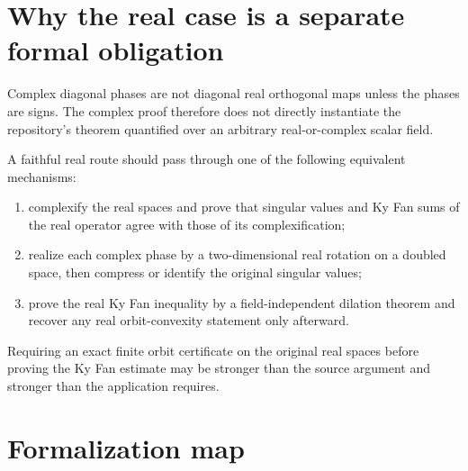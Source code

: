 \section{Why the real case is a separate formal obligation}

Complex diagonal phases are not diagonal real orthogonal maps unless the phases are signs. The complex proof therefore does not directly instantiate the repository's theorem quantified over an arbitrary real-or-complex scalar field.

A faithful real route should pass through one of the following equivalent mechanisms:

\begin{enumerate}[leftmargin=2em]
\item complexify the real spaces and prove that singular values and Ky Fan sums of the real operator agree with those of its complexification;
\item realize each complex phase by a two-dimensional real rotation on a doubled space, then compress or identify the original singular values;
\item prove the real Ky Fan inequality by a field-independent dilation theorem and recover any real orbit-convexity statement only afterward.
\end{enumerate}

Requiring an exact finite orbit certificate on the original real spaces before proving the Ky Fan estimate may be stronger than the source argument and stronger than the application requires.

\section{Formalization map}

